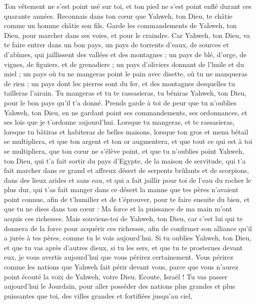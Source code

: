 \begin{multicols}{2}
Ton vêtement ne s'est point usé sur toi, et ton pied ne s’est point enflé durant ces quarante années.
Reconnais dans ton cœur que Yahweh, ton Dieu, te châtie comme un homme châtie son fils.
Garde les commandements de Yahweh, ton Dieu, pour marcher dans ses voies, et pour le craindre.
Car Yahweh, ton Dieu, va te faire entrer dans un bon pays, un pays de torrents d'eaux, de sources et d'abîmes, qui jaillissent des vallées et des montagnes ;
un pays de blé, d'orge, de vignes, de figuiers, et de grenadiers ; un pays d'oliviers donnant de l'huile et du miel ;
un pays où tu ne mangeras point le pain avec disette, où tu ne manqueras de rien ; un pays dont les pierres sont du fer, et des montagnes desquelles tu tailleras l'airain.
Tu mangeras et tu te rassasieras, tu béniras Yahweh, ton Dieu, pour le bon pays qu'il t'a donné.
Prends garde à toi de peur que tu n'oublies Yahweh, ton Dieu, en ne gardant point ses commandements, ses ordonnances, et ses lois que je t’ordonne aujourd'hui.
Lorsque tu mangeras, et te rassasieras, lorsque tu bâtiras et habiteras de belles maisons,
lorsque ton gros et menu bétail se multipliera, et que ton argent et ton or augmentera, et que tout ce qui est à toi se multipliera,
que ton cœur ne s'élève point, et que tu n'oublies point Yahweh, ton Dieu, qui t’a fait sortir du pays d'Egypte, de la maison de servitude,
qui t'a fait marcher dans ce grand et affreux désert de serpents brûlants et de scorpions, dans des lieux arides et sans eau, et qui a fait jaillir pour toi de l'eau du rocher le plus dur,
qui t’as fait manger dans ce désert la manne que tes pères n'avaient point connue, afin de t'humilier et de t'éprouver, pour te faire ensuite du bien,
et que tu ne dises dans ton cœur : Ma force et la puissance de ma main m'ont acquis ces richesses.
Mais souviens-toi de Yahweh, ton Dieu, car c'est lui qui te donnera de la force pour acquérir ces richesses, afin de confirmer son alliance qu'il a jurée à tes pères, comme tu le vois aujourd’hui.
Si tu oublies Yahweh, ton Dieu, et que tu vas après d’autres dieux, si tu les sers, et que tu te prosternes devant eux, je vous avertis aujourd’hui que vous périrez certainement.
Vous périrez comme les nations que Yahweh fait périr devant vous, parce que vous n'aurez point écouté la voix de Yahweh, votre Dieu.
\VerseOne{}Ecoute, Israël ! Tu vas passer aujourd'hui le Jourdain, pour aller posséder des nations plus grandes et plus puissantes que toi, des villes grandes et fortifiées jusqu'au ciel,

\end{multicols}
